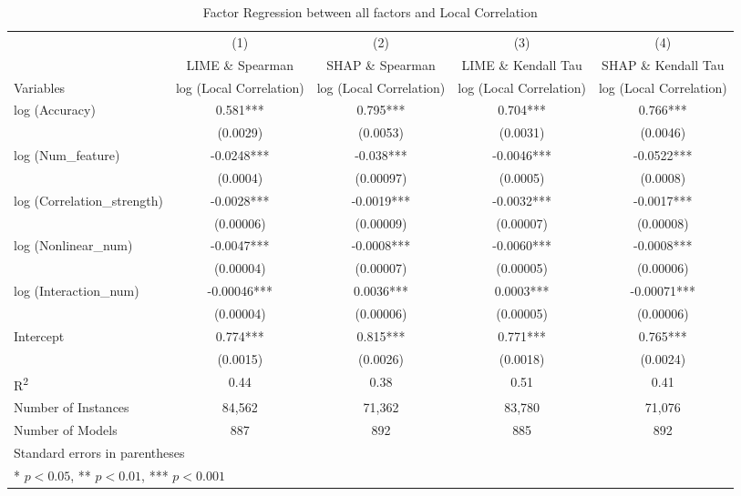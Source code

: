 \documentclass{article}
\begin{document}
\begin{landscape}
\begin{table}[h]
\centering
\caption{Factor Regression between all factors and Local Correlation}
\begin{tabular}{lcccc}
\toprule
 & (1) & (2) & (3) & (4) \\
 & LIME \& Spearman & SHAP \& Spearman & LIME \& Kendall Tau & SHAP \& Kendall Tau \\

Variables & log (Local Correlation) & log (Local Correlation) & log (Local Correlation) & log (Local Correlation) \\
\midrule
log (Accuracy) & 0.581*** & 0.795*** & 0.704*** & 0.766*** \\
 & (0.0029) & (0.0053) & (0.0031) & (0.0046) \\
log (Num\_feature) & -0.0248*** & -0.038*** & -0.0046*** & -0.0522*** \\
 & (0.0004) & (0.00097) & (0.0005) & (0.0008) \\
log (Correlation\_strength) & -0.0028*** & -0.0019*** & -0.0032*** & -0.0017*** \\
 & (0.00006) & (0.00009) & (0.00007) & (0.00008) \\
log (Nonlinear\_num) & -0.0047*** & -0.0008*** & -0.0060*** & -0.0008*** \\
 & (0.00004) & (0.00007) & (0.00005) & (0.00006) \\
log (Interaction\_num) & -0.00046*** & 0.0036*** & 0.0003*** & -0.00071*** \\
 & (0.00004) & (0.00006) & (0.00005) & (0.00006) \\
Intercept & 0.774*** & 0.815*** & 0.771*** & 0.765*** \\
 & (0.0015) & (0.0026) & (0.0018) & (0.0024) \\
\midrule
R\textsuperscript{2} & 0.44 & 0.38 & 0.51 & 0.41 \\
Number of Instances & 84,562 & 71,362 & 83,780 & 71,076 \\
Number of Models & 887 & 892 & 885 & 892 \\
\bottomrule
\multicolumn{5}{l}{Standard errors in parentheses} \\
\multicolumn{5}{l}{* $p<0.05$, ** $p<0.01$, *** $p<0.001$} \\
\end{tabular}
\end{table}
\end{landscape}
\end{document}
